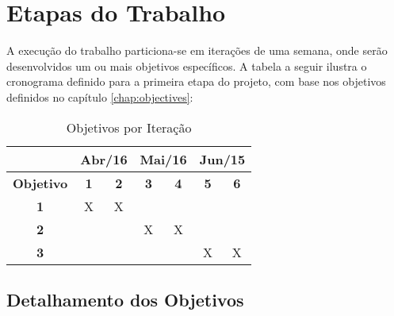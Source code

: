 \chapter{\label{chap:work-plan}Etapas do Trabalho}

A execução do trabalho particiona-se em iterações de uma semana, onde serão
desenvolvidos um ou mais objetivos específicos. A tabela a seguir ilustra o
cronograma definido para a primeira etapa do projeto, com base nos objetivos
definidos no capítulo \ref{chap:objectives}:

\begin{table}[htb!]
\centering
\caption{Objetivos por Iteração}
\label{tab:work-plan}
\begin{tabular}{c|c|c|c|c|c|c|}
\cline{2-7}
{\bf}                                 & \multicolumn{2}{c|}{{\bf Abr/16}}             & \multicolumn{2}{c|}{{\bf Mai/16}}             & \multicolumn{2}{c|}{{\bf Jun/15}} \\ \hline
\multicolumn{1}{|c|}{{\bf Objetivo}}  & {\bf 1}               & {\bf 2}               & {\bf 3}               & {\bf 4}               & {\bf 5}               & {\bf 6}   \\ \hline
\multicolumn{1}{|c|}{{\bf 1}}         & X                     & X                     &                       &                       &                       &     \\ \hline
\multicolumn{1}{|c|}{{\bf 2}}         &                       &                       & X                     & X                     &                       &     \\ \hline
\multicolumn{1}{|c|}{{\bf 3}}         &                       &                       &                       &                       & X                     & X   \\ \hline
\end{tabular}
\end{table}

\section{Detalhamento dos Objetivos}


